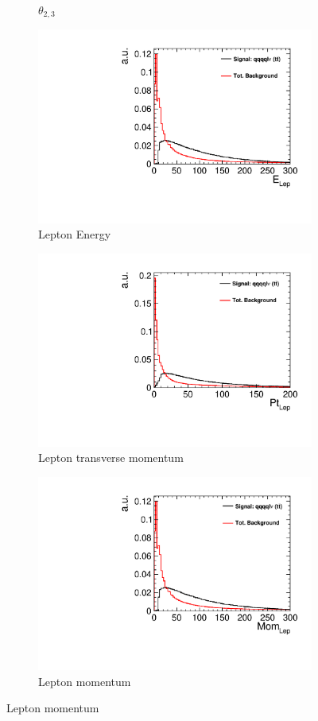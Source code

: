 \begin{figure}[]
\begin{subfigure}[b]{0.5\linewidth}
    \caption{$\theta_{2,3}$} 
    \vspace{4ex}
  \end{subfigure}%
  \begin{subfigure}[b]{0.5\linewidth}
    \centering
    \includegraphics[width=0.75\linewidth]{TopAnalysis/figures/BDTVariables/IsoLepEnergy.pdf} 
    \caption{Lepton Energy} 
    \vspace{4ex}
  \end{subfigure}
  \begin{subfigure}[b]{0.5\linewidth}
    \centering
    \includegraphics[width=0.75\linewidth]{TopAnalysis/figures/BDTVariables/IsoLepPt.pdf} 
    \caption{Lepton transverse momentum} 
    \vspace{4ex}
  \end{subfigure}%
  \begin{subfigure}[b]{0.5\linewidth}
    \centering
    \includegraphics[width=0.75\linewidth]{TopAnalysis/figures/BDTVariables/IsoLepMomentum.pdf} 
    \caption{Lepton momentum} 
    \vspace{4ex}
  \end{subfigure}
\end{figure}

